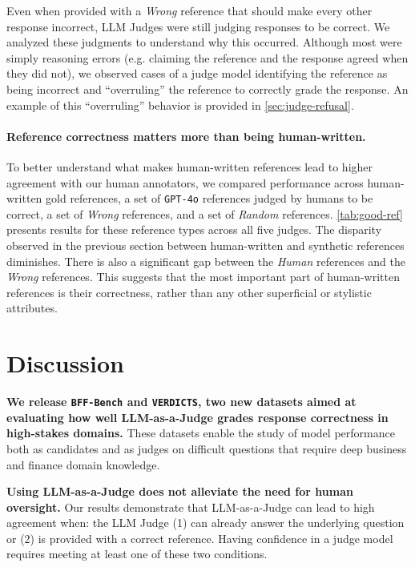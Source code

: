 \documentclass{article}
\newcommand{\judgebenchmark}{\texttt{VERDICTS}}
\newcommand{\evalbenchmark}{\texttt{BFF-Bench}}
\begin{document}
Even when provided with a \textit{Wrong} reference that should make every other response incorrect, LLM Judges were still judging responses to be correct. We analyzed these judgments to understand why this occurred. Although most were simply reasoning errors (e.g. claiming the reference and the response agreed when they did not), we observed cases of a judge model identifying the reference as being incorrect and ``overruling'' the reference to correctly grade the response. An example of this ``overruling'' behavior is provided in \cref{sec:judge-refusal}.



\paragraph{Reference correctness matters more than being human-written.}
To better understand what makes human-written references lead to higher agreement with our human annotators, we compared performance across human-written gold references, a set of \texttt{GPT-4o} references judged by humans to be correct, a set of \textit{Wrong} references, and a set of \textit{Random} references. \cref{tab:good-ref} presents results for these  reference types across all five judges. The disparity observed in the previous section between human-written and synthetic references diminishes. There is also a significant gap between the \textit{Human} references and the \textit{Wrong} references. This suggests that the most important part of human-written references is their correctness, rather than any other superficial or stylistic attributes.

\section{Discussion}
\label{sec:limitations}

{\bf We release \evalbenchmark{} and \judgebenchmark{}, two new datasets aimed at evaluating how well LLM-as-a-Judge grades response correctness in high-stakes domains.} These datasets enable the study of model performance both as candidates and as judges on difficult questions that require deep business and finance domain knowledge.

{\bf Using LLM-as-a-Judge does not alleviate the need for human oversight.} Our results demonstrate that LLM-as-a-Judge can lead to high agreement when: the LLM Judge  (1) can already answer the underlying question or (2) is provided with a correct reference. Having confidence in a judge model requires meeting at least one of these two conditions.
\end{document}
